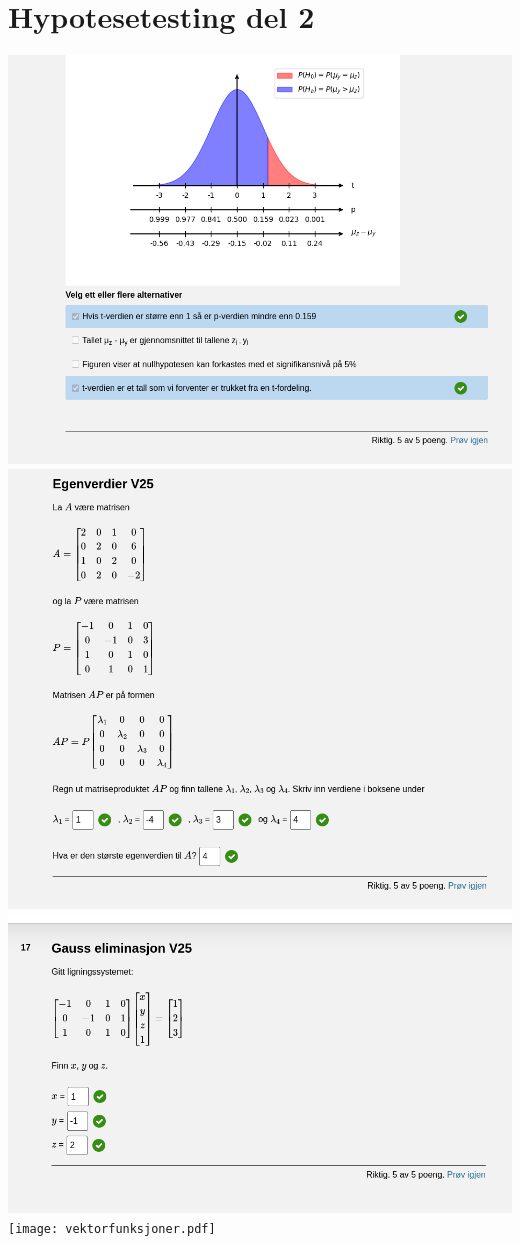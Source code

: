 \documentclass[12pt]{article}
\begin{document}
\section*{Hypotesetesting del 2}
\includegraphics[width=\textwidth]{Screenshot_20250521_140940.png}
\newpage
\includegraphics[width=\textwidth]{Screenshot_20250521_143407.png}
\newpage
\includegraphics[width=\textwidth]{Screenshot_20250521_141804.png}
\newpage
\texttt{[image: vektorfunksjoner.pdf]}
\end{document}
